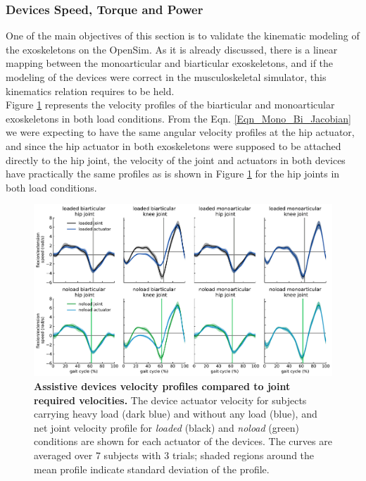 \documentclass[10pt,letterpaper]{article}
\begin{document}
\subsubsection*{Devices Speed, Torque and Power}
One of the main objectives of this section is to validate the kinematic modeling of the exoskeletons on the OpenSim. As it is already discussed, there is a linear mapping between the monoarticular and biarticular exoskeletons, and if the modeling of the devices were correct in the musculoskeletal simulator, this kinematics relation requires to be held.\\
Figure \ref{Fig_IdealExo_Speed} represents the velocity profiles of the biarticular and monoarticular exoskeletons in both load conditions. From the Eqn. \eqref{Eqn_Mono_Bi_Jacobian} we were expecting to have the same angular velocity profiles at the hip actuator, and since the hip actuator in both exoskeletons were supposed to be attached directly to the hip joint, the velocity of the joint and actuators in both devices have practically the same profiles as is shown in Figure \ref{Fig_IdealExo_Speed}  for the hip joints in both load conditions.\\
\begin{figure}[ht]   
	\centering
	\includegraphics[width=\linewidth]{Ideal_Exo_MonovsBi_Figures/PaperFigure_Exoskeletons_Speed.pdf}
	\vspace{1mm}
	\caption{{\small\textbf{Assistive devices velocity profiles compared to joint required velocities.} The device actuator velocity for subjects carrying heavy load (dark blue) and without any load (blue), and net joint velocity profile for \textit{loaded} (black) and \textit{noload} (green) conditions are shown for each actuator of the devices. The curves are averaged over 7 subjects with 3 trials; shaded regions around the mean profile indicate standard deviation of the profile.}}
	\label{Fig_IdealExo_Speed}
\end{figure}
\end{document}

